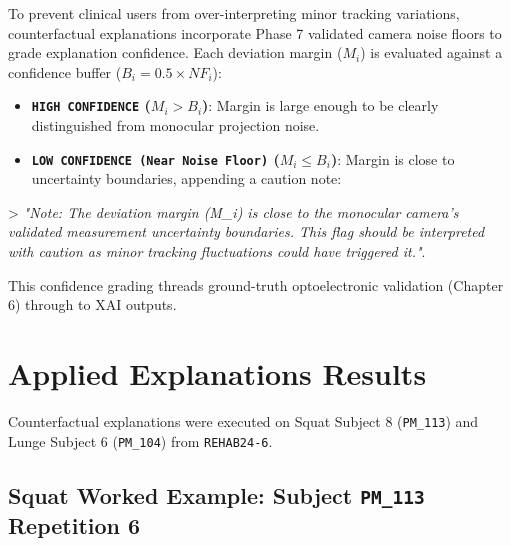 To prevent clinical users from over-interpreting minor tracking variations, counterfactual explanations incorporate Phase 7 validated camera noise floors to grade explanation confidence. Each deviation margin ($M_i$) is evaluated against a confidence buffer ($B_i = 0.5 \times NF_i$):
\begin{itemize}
  \item \textbf{\texttt{HIGH CONFIDENCE} ($M_i > B_i$)}: Margin is large enough to be clearly distinguished from monocular projection noise.
  \item \textbf{\texttt{LOW CONFIDENCE (Near Noise Floor)} ($M_i \le B_i$)}: Margin is close to uncertainty boundaries, appending a caution note:
\end{itemize}
> \textit{"Note: The deviation margin (M\_i) is close to the monocular camera's validated measurement uncertainty boundaries. This flag should be interpreted with caution as minor tracking fluctuations could have triggered it."}.

This confidence grading threads ground-truth optoelectronic validation (Chapter 6) through to XAI outputs.



\section{Applied Explanations Results}
\label{sec:12-7-applied-explanations-results}


Counterfactual explanations were executed on Squat Subject 8 (\texttt{PM\_113}) and Lunge Subject 6 (\texttt{PM\_104}) from \texttt{REHAB24-6}.

\subsection{Squat Worked Example: Subject \texttt{PM\_113} Repetition 6}
\label{sec:12-7-1-squat-worked-example-subject-texttt-pm-113-repetition-6}

